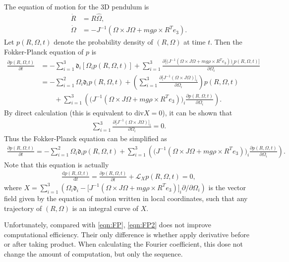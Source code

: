 \documentclass[10pt]{article}
\newcommand{\diff}[1]{\mathrm{d}#1}
\newcommand{\liediff}{\mathfrak{d}}
\begin{document}
The equation of motion for the 3D pendulum is
\begin{align*}
	\dot{R} &= R\hat{\Omega}, \\
	\dot{\Omega} &= -J^{-1} \left( \Omega\times J\Omega + mg\rho\times R^Te_3 \right).
\end{align*}
Let $p(R,\Omega,t)$ denote the probability density of $(R,\Omega)$ at time $t$.
Then the Fokker-Planck equation of $p$ is
\begin{align} \label{eqn:FP}
	\frac{\partial p(R,\Omega,t)}{\partial t} &= -\sum_{i=1}^{3}\liediff_i [\Omega_ip(R,\Omega,t)] + \sum_{i=1}^3 \frac{\partial \Big[ \big(J^{-1}(\Omega\times J\Omega + mg\rho\times R^Te_3)\big)_i p(R,\Omega,t) \Big]}{\partial \Omega_i} \\
	&= -\sum_{i=1}^2 \Omega_i \liediff_ip(R,\Omega,t) + \left( \sum_{i=1}^3 \frac{\partial \big[J^{-1}(\Omega\times J\Omega)\big]_i}{\partial \Omega_i} \right)p(R,\Omega,t) \nonumber \\
	&\qquad + \sum_{i=1}^3 \left( \big(J^{-1}(\Omega\times J\Omega + mg\rho\times R^Te_3)\big)_i \frac{\partial p(R,\Omega,t)}{\partial \Omega_i} \right). \nonumber
\end{align}
By direct calculation (this is equivalent to $\mathrm{div}X = 0$), it can be shown that
\begin{align*}
	\sum_{i=1}^3 \frac{\partial \big[J^{-1}(\Omega\times J\Omega)\big]_i}{\partial \Omega_i} = 0.
\end{align*}
Thus the Fokker-Planck equation can be simplified as
\begin{align} \label{eqn:FP2}
	\frac{\partial p(R,\Omega,t)}{\partial t} = -\sum_{i=1}^2 \Omega_i \liediff_ip(R,\Omega,t) + \sum_{i=1}^3 \left( \big(J^{-1}(\Omega\times J\Omega + mg\rho\times R^Te_3)\big)_i \frac{\partial p(R,\Omega,t)}{\partial \Omega_i} \right).
\end{align}
Note that this equation is actually
\begin{align*}
	\frac{\diff{p(R,\Omega,t)}}{\diff{t}} = \frac{\partial p(R,\Omega,t)}{\partial t} + \mathcal{L}_X p(R,\Omega,t) = 0,
\end{align*}
where $X = \sum_{i=1}^3 \left( \Omega_i\liediff_i - \big[ J^{-1}(\Omega\times J\Omega + mg\rho\times R^Te_3) \big]_i \partial/\partial\Omega_i \right)$ is the vector field given by the equation of motion written in local coordinates, such that any trajectory of $(R,\Omega)$ is an integral curve of $X$.

Unfortunately, compared with \eqref{eqn:FP}, \eqref{eqn:FP2} does not improve computational efficiency.
Their only difference is whether apply derivative before or after taking product.
When calculating the Fourier coefficient, this dose not change the amount of computation, but only the sequence.
\end{document}
